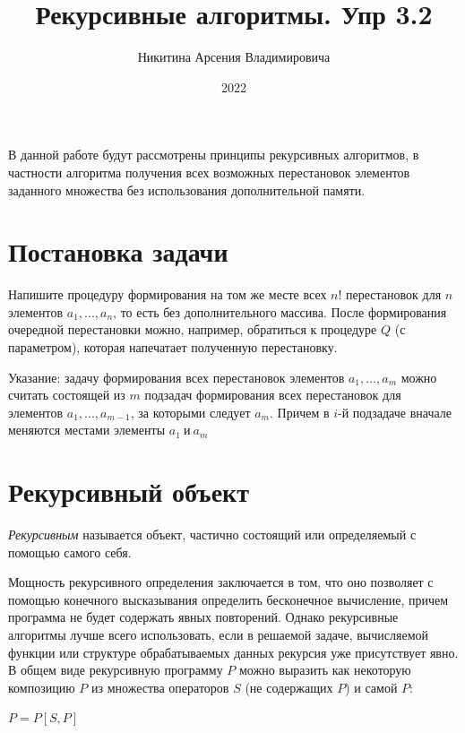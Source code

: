 \documentclass[bachelor, och, labwork]{shiza}
\begin{document}

\title{Рекурсивные алгоритмы. Упр 3.2}





\author{Никитина Арсения Владимировича}



\date{2022}

\maketitle

\tableofcontents

\intro
В данной работе будут рассмотрены принципы рекурсивных алгоритмов, в частности
алгоритма получения всех возможных перестановок элементов заданного множества
без использования дополнительной памяти.

\section{Постановка задачи}
Напишите процедуру формирования на том же месте всех $n!$ перестановок для $n$
элементов $a_1,...,a_n$, то есть без дополнительного массива. После формирования
очередной перестановки можно, например, обратиться к процедуре $Q$ (с параметром),
которая напечатает полученную перестановку.

Указание: задачу формирования всех перестановок элементов $a_1,...,a_m$ можно
считать состоящей из $m$ подзадач формирования всех перестановок для элементов
$a_1,...,a_{m-1}$, за которыми следует $a_m$. Причем в $i$-й подзадаче вначале
меняются местами элементы $a_1 ~\text{и}~ a_m$

\section{Рекурсивный объект}

\textit{Рекурсивным} называется объект, частично состоящий или определяемый с
помощью самого себя.

Мощность рекурсивного определения заключается в том, что оно позволяет с помощью
конечного высказывания определить бесконечное вычисление, причем программа не 
будет содержать явных повторений. Однако рекурсивные алгоритмы лучше всего
использовать, если в решаемой задаче, вычисляемой функции или структуре
обрабатываемых данных рекурсия уже присутствует явно. В общем виде рекурсивную
программу $P$ можно выразить как некоторую композицию $P$ из множества
операторов $S$ (не содержащих $P$) и самой $P$:
\begin{center}$P=P[S,P]$\end{center}
\end{document}
